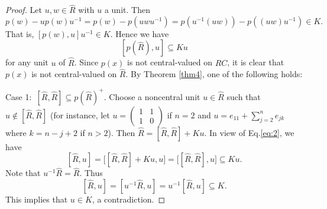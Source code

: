 \documentclass[11pt]{article}
\theoremstyle{definition}
\begin{document}
{{{{\begin{proof}
Let $u, w\in \widehat R$ with $u$ a unit. Then
\begin{equation}\label{eq:5}
p(w)-up(w)u^{-1}=p(w)-p(uwu^{-1})=p(u^{-1}(uw))-p((uw)u^{-1})\in K.
\end{equation}
That is,
$
[p(w), u]u^{-1}\in K.
$
Hence we have
\begin{equation}\label{eq:2}
[p(\widehat R), u]\subseteq Ku
\end{equation}
for any unit $u$ of $\widehat R$. Since $p(x)$ is not central-valued on $RC$, it is clear that $p(x)$ is not central-valued on $\widehat R$.
By Theorem \ref{thm4}, one of the following holds:

Case 1:\ $[\widehat R, \widehat R]\subseteq p(\widehat R)^+$. Choose a noncentral unit $u\in \widehat R$ such that $u\notin [\widehat R, \widehat R]$ (for instance, let  $u=\begin{pmatrix}
						1 & 1 \\
						1 & 0
					\end{pmatrix}$ if $n=2$ and $u=e_{11}+\sum_{j=2}^ne_{jk}$ where $k=n-j+2$ if $n>2$). Then
$\widehat R=[\widehat R, \widehat R]+Ku$. In view of Eq.\eqref{eq:2}, we have
$$
[\widehat R, u]=\big[[\widehat R, \widehat R]+Ku, u\big]=\big[[\widehat R, \widehat R], u\big]\subseteq Ku.
$$
Note that $u^{-1}\widehat R=\widehat R$. Thus
$$
[\widehat R, u]=[u^{-1}\widehat R, u]=u^{-1}[\widehat R, u]\subseteq K.
$$
This implies that $u\in K$, a contradiction.


\end{proof}}}}}
\end{document}

